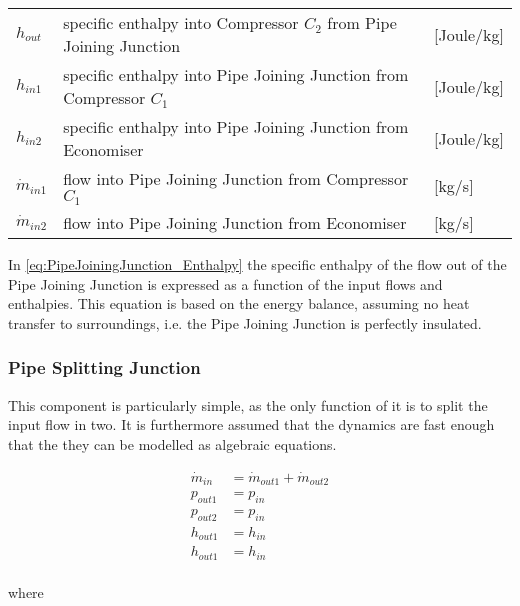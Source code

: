 \begin{center}
	\begin{tabular}{l p{10cm} l}
		$h_{out}$ 	& specific enthalpy into Compressor $ C_2 $ from Pipe Joining Junction 		& [\si{Joule}/\si{kg}]\\ 
		$h_{in1}$ 	& specific enthalpy into Pipe Joining Junction from Compressor $ C_1 $  		& [\si{Joule}/\si{kg}]\\ 
		$h_{in2}$ 	& specific enthalpy into Pipe Joining Junction from Economiser   			& [\si{Joule}/\si{kg}]\\ 
		$\dot{m}_{in1}$ & flow into Pipe Joining Junction from Compressor $ C_1 $ 		& [\si{kg}/\si{s}]\\
		$\dot{m}_{in2}$ & flow into Pipe Joining Junction from Economiser 				& [\si{kg}/\si{s}]\\
	\end{tabular}
\end{center}
In \cref{eq:PipeJoiningJunction_Enthalpy} the specific enthalpy of the flow out of the Pipe Joining Junction is expressed as a function of the input flows and enthalpies. This equation is based on the energy balance, assuming no heat transfer to surroundings, i.e. the Pipe Joining Junction is perfectly insulated.

\subsubsection{Pipe Splitting Junction}

This component is particularly simple, as the only function of it is to split the input flow in two. It is furthermore assumed that the dynamics are fast enough that the they can be modelled as algebraic equations.

\begin{equation} \label{eq:PipeSplittingJunction_Enthalpy}
	\begin{split}
		\dot{m}_{in} &= \dot{m}_{out1} + \dot{m}_{out2} \\
		p_{out1} &= p_{in} \\
		p_{out2} &= p_{in} \\
		h_{out1} &= h_{in} \\
		h_{out1} &= h_{in} \\
	\end{split}
\end{equation}

where

